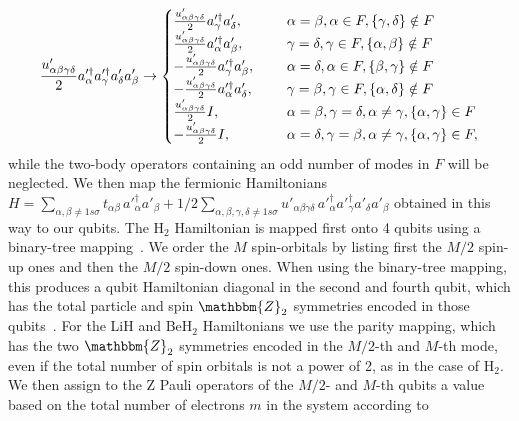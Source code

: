\documentclass[twocolumn]{revtex4-1}
\newcommand{\1}{\mathbbm{1}}
\newcommand{\bZ}{\mathbbm{Z}}
\begin{document}
\begin{align}
\frac{u'_{\alpha\beta\gamma\delta}}{2} a'^\dag_{\alpha} a'^\dag_{\gamma} a'_{\delta}a'_\beta\rightarrow
\begin{cases}
\frac{u'_{\alpha\beta\gamma\delta}}{2}a'^\dag_\gamma a'_\delta,\hspace{0.5cm}&\alpha=\beta, \alpha\in F,\{\gamma,\delta\}\notin F\\
\frac{u'_{\alpha\beta\gamma\delta}}{2}a'^\dag_\alpha a'_\beta,\hspace{0.5cm}&\gamma=\delta, \gamma\in F,\{\alpha,\beta\}\notin F\\
-\frac{u'_{\alpha\beta\gamma\delta}}{2}a'^\dag_\gamma a'_\beta,\hspace{0.5cm}&\alpha=\delta, \alpha\in F,\{\beta,\gamma\}\notin F\\
-\frac{u'_{\alpha\beta\gamma\delta}}{2}a'^\dag_\alpha a'_\delta,\hspace{0.5cm}&\gamma=\beta, \gamma\in F,\{\alpha,\delta\}\notin F\\
\frac{u'_{\alpha\beta\gamma\delta}}{2}I,\hspace{0.5cm}&\alpha=\beta,\gamma=\delta,\alpha \neq \gamma,\{\alpha,\gamma\}\in F\\
-\frac{u'_{\alpha\beta\gamma\delta}}{2}I,\hspace{0.5cm}&\alpha=\delta,\gamma=\beta,\alpha \neq \gamma,\{\alpha,\gamma\}\in F,
\end{cases}
\end{align}
while the two-body operators containing an odd number of modes in $F$ will be neglected.
We then map the fermionic Hamiltonians $H =\sum_{\alpha, \beta\neq 1s\sigma} t_{\alpha \beta} \, a'^\dag_{\alpha} a'_{\beta} +1/2  \sum_{\alpha, \beta, \gamma, \delta \neq 1s\sigma} u'_{\alpha \beta \gamma \delta}\, a'^\dag_{\alpha} a'^\dag_{\gamma} a'_{\delta} a'_{\beta}$ obtained in this way to our qubits.
The H$_2$ Hamiltonian is mapped first onto 4 qubits using a binary-tree mapping~\cite{BK2002S}. We order the $M$ spin-orbitals by listing first the $M/2$ spin-up ones and then the $M/2$ spin-down ones. When using the binary-tree mapping, this produces a qubit Hamiltonian diagonal in the second and fourth qubit, which has the total particle and spin $\bZ_2$ symmetries encoded in those qubits~\cite{TaperingS}. For the LiH and BeH$_2$ Hamiltonians we use the parity mapping, which has the two $\bZ_2$ symmetries encoded in the $M/2$-th and $M$-th mode, even if the total number of spin orbitals is not a power of 2, as in the case of H$_2$. We then assign to the Z Pauli operators of the $M/2$- and $M$-th qubits a value based on the total number of electrons $m$ in the system according to
\end{document}
